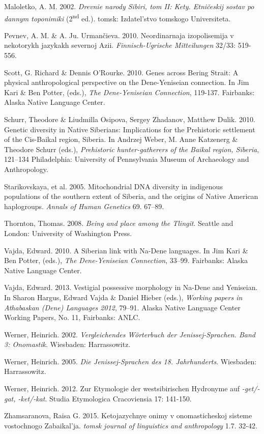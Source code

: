 \begin{hang}
Maloletko, A. M. 2002. \textit{Drevnie narody Sibiri, tom II: Kety. Etničeskij sostav po dannym toponimiki} (2\textsuperscript{nd} ed.). tomsk: Izdatel’stvo tomskogo Universiteta.

Pevnev, A. M. \& A. Ju. Urmančieva. 2010. Neordinarnaja izopolisemija v nekotorykh jazykakh severnoj Azii. \textit{Finnisch-Ugrische Mitteilungen} 32/33: 519-556.

Scott, G. Richard \& Dennis O’Rourke. 2010. Genes across Bering Strait: A physical anthropological perspective on the Dene-Yeniseian connection. In Jim Kari \& Ben Potter, (eds.), \textit{The Dene-Yeniseian Connection}, 119-137. Fairbanks: Alaska Native Language Center.

Schurr, Theodore \& Liudmilla Osipova, Sergey Zhadanov, Matthew Dulik. 2010. Genetic diversity in Native Siberians: Implications for the Prehistoric settlement of the Cis-Baikal region, Siberia. In Andrzej Weber, M. Anne Katzenerg \& Theodore Schurr (eds.), \textit{Prehistoric hunter-gatherers of the Baikal region, Siberia}, 121--134  Philadelphia: University of Pennsylvania Museum of Archaeology and Anthropology.

Starikovskaya, et al. 2005. Mitochondrial DNA diversity in indigenous populations of the southern extent of Siberia, and the origins of Native American haplogroups. \textit{Annals of Human Genetics} 69. 67–89.

Thornton, Thomas. 2008. \textit{Being and place among the Tlingit}. Seattle and London: University of Washington Press.

Vajda, Edward. 2010. A Siberian link with Na-Dene languages. In Jim Kari \& Ben Potter, (eds.), \textit{The Dene-Yeniseian Connection}, 33--99. Fairbanks: Alaska Native Language Center.

Vajda, Edward. 2013. Vestigial possessive morphology in Na-Dene and Yeniseian. In Sharon Hargus, Edward Vajda \& Daniel Hieber (eds.), \textit{Working papers in Athabaskan (Dene) Languages 2012}, 79--91. Alaska Native Language Center Working Papers, No. 11, Fairbanks: ANLC.

Werner, Heinrich. 2002. \textit{Vergleichendes Wörterbuch der Jenissej-Sprachen. Band 3: Onomastik}. Wiesbaden: Harrassowitz.

Werner, Heinrich. 2005. \textit{Die Jenissej-Sprachen des 18. Jahrhunderts}. Wiesbaden: Harrassowitz.

Werner, Heinrich. 2012. Zur Etymologie der westsibirischen Hydronyme auf \textit{{}-get/-gat, -ket/-kat}. Studia Etymologica Cracoviensia 17: 141-150.~

Zhamsaranova, Raisa G. 2015. Ketojazychnye onimy v onomasticheskoj sisteme vostochnogo Zabaikal’ja. \textit{tomsk journal of linguistics and anthropology} 1.7. 32-42.



\end{hang}
\label{vajda-ch-end}
